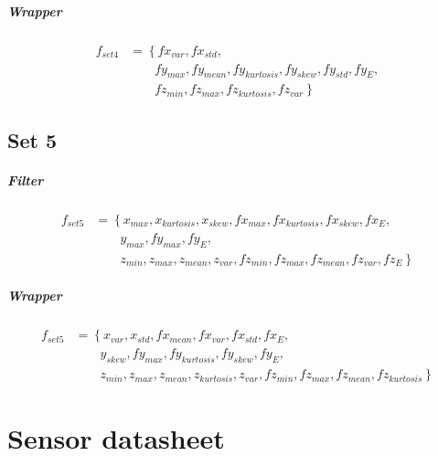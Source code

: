 \documentclass[USenglish]{ifimaster}  %
\begin{document}
\paragraph{Wrapper}
\begin{align}
f_{set4} &= \left\{ fx_{var}, fx_{std}, \right.\nonumber\\
&\qquad \left. {} fy_{max}, fy_{mean}, fy_{kurtosis}, fy_{skew}, fy_{std}, fy_{E}, \right.\nonumber\\
&\qquad \left. {} fz_{min}, fz_{max}, fz_{kurtosis}, fz_{var} \right\}
\end{align}

\section{Set 5}
\paragraph{Filter}
\begin{align}
f_{set5} &= \left\{ x_{max}, x_{kurtosis}, x_{skew}, fx_{max}, fx_{kurtosis}, fx_{skew}, fx_{E}, \right.\nonumber\\
&\qquad \left. {} y_{max}, fy_{max}, fy_{E}, \right.\nonumber\\
&\qquad \left. {} z_{min}, z_{max}, z_{mean}, z_{var}, fz_{min}, fz_{max}, fz_{mean}, fz_{var}, fz_{E} \right\}
\end{align}

\paragraph{Wrapper}
\begin{align}
f_{set5} &= \left\{ x_{var}, x_{std}, fx_{mean}, fx_{var}, fx_{std}, fx_{E}, \right.\nonumber\\
&\qquad \left. {} y_{skew}, fy_{max}, fy_{kurtosis}, fy_{skew}, fy_{E}, \right.\nonumber\\
&\qquad \left. {} z_{min}, z_{max}, z_{mean}, z_{kurtosis}, z_{var}, fz_{min}, fz_{max}, fz_{mean}, fz_{kurtosis} \right\}
\end{align}
\chapter{Sensor datasheet}\label{ap:datasheet}



\backmatter{}


\end{document}
